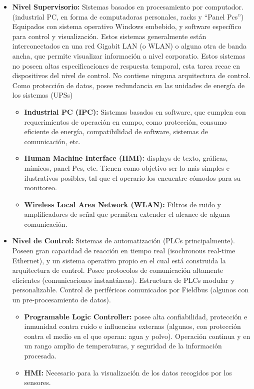 \documentclass[10pt,graphicx,caption,rotating]{article}
\begin{document}
\begin{itemize}
  \item \textbf{Nivel Supervisorio:} Sistemas basados en procesamiento por computador. (industrial PC, en forma de computadoras personales, racks y “Panel Pcs”) Equipados con sistema operativo Windows embebido, y software específico para control y visualización. Estos sistemas generalmente están interconectados en una red Gigabit LAN (o WLAN) o alguna otra de banda ancha, que permite visualizar información a nivel corporatio. Estos sistemas no poseen altas especificaciones de respuesta temporal, esta tarea recae en dispositivos del nivel de control. No contiene ninguna arquitectura de control. Como protección de datos, posee redundancia en las unidades de energía de los sistemas (UPSs)
  \begin{itemize}
    \item \textbf{Industrial PC (IPC):} Sistemas basados en software, que cumplen con requerimientos de operación en campo, como protección, consumo eficiente de energía, compatibilidad de software, sistemas de comunicación, etc.
    \item \textbf{Human Machine Interface (HMI):} displays de texto, gráficas, mímicos, panel Pcs, etc. Tienen como objetivo ser lo más simples e ilustrativos posibles, tal que el operario los encuentre cómodos para su monitoreo.
    \item \textbf{Wireless Local Area Network (WLAN):} Filtros de ruido y amplificadores de señal que permiten extender el alcance de alguna comunicación.
  \end{itemize}
  \item \textbf{Nivel de Control:} Sistemas de automatización (PLCs principalmente). Poseen gran capacidad de reacción en tiempo real (isochronous real-time Ethernet), y un sistema operativo propio en el cual está construida la arquitectura de control. Posee protocolos de comunicación altamente eficientes (comunicaciones instantáneas). Estructura de PLCs modular y personalizable. Control de periféricos  comunicados por Fieldbus (algunos con un pre-procesamiento de datos).
  \begin{itemize}
    \item \textbf{Programable Logic Controller:} posee alta confiabilidad, protección e inmunidad contra ruido e influencias externas (algunos, con protección contra el medio en el que operan: agua y polvo). Operación continua y en un rango amplio de temperaturas, y seguridad de la información procesada.
    \item \textbf{HMI:} Necesario para la visualización de los datos recogidos por los sensores.

\end{itemize}
\end{itemize}
\end{document}
